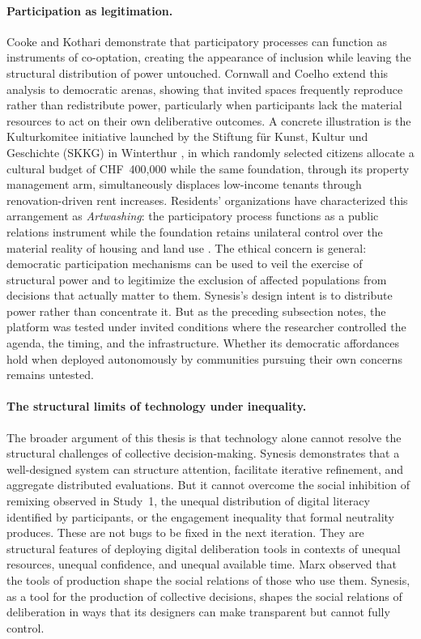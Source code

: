 \documentclass[a4paper, 12pt, twoside]{iviathesis}
\begin{document}
\paragraph{Participation as legitimation.}
Cooke and Kothari \cite{cooke2001} demonstrate that participatory processes can function as instruments of co-optation, creating the appearance of inclusion while leaving the structural distribution of power untouched. Cornwall and Coelho \cite{cornwall2007} extend this analysis to democratic arenas, showing that invited spaces frequently reproduce rather than redistribute power, particularly when participants lack the material resources to act on their own deliberative outcomes. A concrete illustration is the Kulturkomitee initiative launched by the Stiftung f\"ur Kunst, Kultur und Geschichte (SKKG) in Winterthur \cite{skkg2021kulturkomitee}, in which randomly selected citizens allocate a cultural budget of CHF~400,000 while the same foundation, through its property management arm, simultaneously displaces low-income tenants through renovation-driven rent increases. Residents' organizations have characterized this arrangement as \textit{Artwashing}: the participatory process functions as a public relations instrument while the foundation retains unilateral control over the material reality of housing and land use \cite{igbbsl2026, haeuservernetzung2023}. The ethical concern is general: democratic participation mechanisms can be used to veil the exercise of structural power and to legitimize the exclusion of affected populations from decisions that actually matter to them. Synesis's design intent is to distribute power rather than concentrate it. But as the preceding subsection notes, the platform was tested under invited conditions where the researcher controlled the agenda, the timing, and the infrastructure. Whether its democratic affordances hold when deployed autonomously by communities pursuing their own concerns remains untested.

\paragraph{The structural limits of technology under inequality.}
The broader argument of this thesis is that technology alone cannot resolve the structural challenges of collective decision-making. Synesis demonstrates that a well-designed system can structure attention, facilitate iterative refinement, and aggregate distributed evaluations. But it cannot overcome the social inhibition of remixing observed in Study~1, the unequal distribution of digital literacy identified by participants, or the engagement inequality that formal neutrality produces. These are not bugs to be fixed in the next iteration. They are structural features of deploying digital deliberation tools in contexts of unequal resources, unequal confidence, and unequal available time. Marx \cite{marx1867capital} observed that the tools of production shape the social relations of those who use them. Synesis, as a tool for the production of collective decisions, shapes the social relations of deliberation in ways that its designers can make transparent but cannot fully control.
\end{document}
